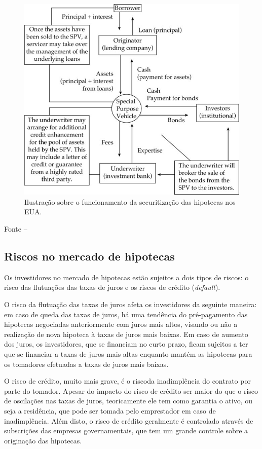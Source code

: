 \documentclass[
	12pt,				%
	oneside,			%
	a4paper,			%
	chapter=TITLE,		%
	section=TITLE,		%
	english,			%
	brazil				%
	]{abntex2}
\newcommand{\bcenter}{\begin{center}}
\newcommand{\ecenter}{\end{center}}
\begin{document}
\begin{refsection}
\begin{figure}[H]
{\centering \includegraphics[width=0.7\linewidth]{images/a-Mortgage-securitization-Package_W640} 

}

\caption{Ilustração sobre o funcionamento da securitização das hipotecas nos EUA.}\label{fig:securitizacao}
\end{figure}
\bcenter

Fonte -- \textcite[p.~30]{fligstein}
\ecenter

\hypertarget{riscos-no-mercado-de-hipotecas}{%
\subsection{Riscos no mercado de hipotecas}\label{riscos-no-mercado-de-hipotecas}}

Os investidores no mercado de hipotecas estão sujeitos a dois tipos de riscos: o
risco das flutuações das taxas de juros e os riscos de crédito (\emph{default}).

O risco da flutuação das taxas de juros afeta os investidores da seguinte
maneira: em caso de queda das taxas de juros, há uma tendência do pré-pagamento
das hipotecas negociadas anteriormente com juros mais altos, visando ou não a
realização de nova hipoteca à taxas de juros mais baixas. Em caso de aumento dos
juros, os investidores, que se financiam no curto prazo, ficam sujeitos a ter
que se financiar a taxas de juros mais altas enquanto mantém as hipotecas para
os tomadores efetuadas a taxas de juros mais baixas.

O risco de crédito, muito mais grave, é o riscoda inadimplência do contrato por
parte do tomador. Apesar do impacto do risco de crédito ser maior do que o risco
de oscilações nas taxas de juros, teoricamente ele tem como garantia o ativo, ou
seja a residência, que pode ser tomada pelo emprestador em caso de inadimplência.
Além disto, o risco de crédito geralmente é controlado através de subscrições das
empresas governamentais, que tem um grande controle sobre a originação das
hipotecas.


\end{refsection}
\end{document}
